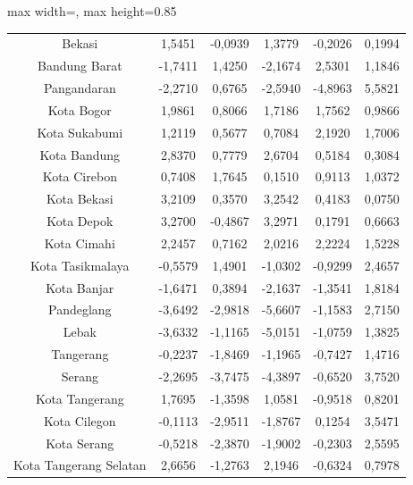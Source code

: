 \begin{table}[H]
\begin{adjustbox}{max width=\textwidth, max height=0.85\textheight}
\begin{tabular}{|c|c|c|c|c|c|}
Bekasi & 1,5451 & -0,0939 & 1,3779 & -0,2026 & 0,1994 \\
Bandung Barat & -1,7411 & 1,4250 & -2,1674 & 2,5301 & 1,1846 \\
Pangandaran & -2,2710 & 0,6765 & -2,5940 & -4,8963 & 5,5821 \\
Kota Bogor & 1,9861 & 0,8066 & 1,7186 & 1,7562 & 0,9866 \\
Kota Sukabumi & 1,2119 & 0,5677 & 0,7084 & 2,1920 & 1,7006 \\
Kota Bandung & 2,8370 & 0,7779 & 2,6704 & 0,5184 & 0,3084 \\
Kota Cirebon & 0,7408 & 1,7645 & 0,1510 & 0,9113 & 1,0372 \\
Kota Bekasi & 3,2109 & 0,3570 & 3,2542 & 0,4183 & 0,0750 \\
Kota Depok & 3,2700 & -0,4867 & 3,2971 & 0,1791 & 0,6663 \\
Kota Cimahi & 2,2457 & 0,7162 & 2,0216 & 2,2224 & 1,5228 \\
Kota Tasikmalaya & -0,5579 & 1,4901 & -1,0302 & -0,9299 & 2,4657 \\
Kota Banjar & -1,6471 & 0,3894 & -2,1637 & -1,3541 & 1,8184 \\
Pandeglang & -3,6492 & -2,9818 & -5,6607 & -1,1583 & 2,7150 \\
Lebak & -3,6332 & -1,1165 & -5,0151 & -1,0759 & 1,3825 \\
Tangerang & -0,2237 & -1,8469 & -1,1965 & -0,7427 & 1,4716 \\
Serang & -2,2695 & -3,7475 & -4,3897 & -0,6520 & 3,7520 \\
Kota Tangerang & 1,7695 & -1,3598 & 1,0581 & -0,9518 & 0,8201 \\
Kota Cilegon & -0,1113 & -2,9511 & -1,8767 & 0,1254 & 3,5471 \\
Kota Serang & -0,5218 & -2,3870 & -1,9002 & -0,2303 & 2,5595 \\
Kota Tangerang Selatan & 2,6656 & -1,2763 & 2,1946 & -0,6324 & 0,7978 \\
\hline
\end{tabular}
\end{adjustbox}
\end{table}